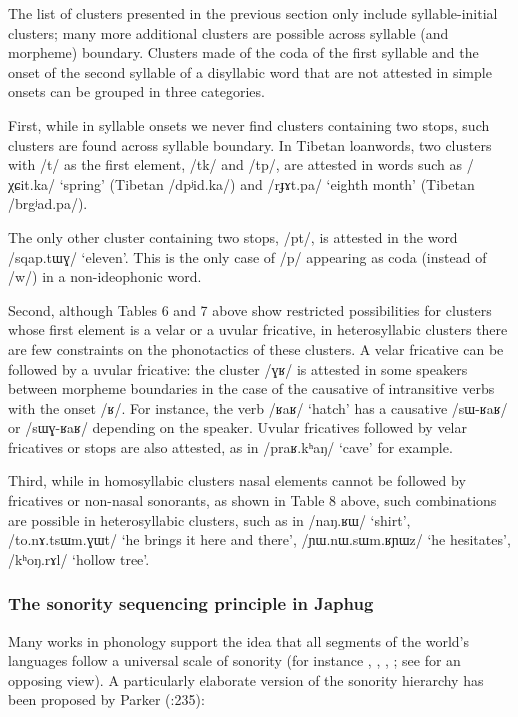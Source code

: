 \documentclass[12pt]{article}
\newcommand{\ipa}[1]{\mbox{\phon/#1/}}
\begin{document}
 The list of clusters presented in the previous section only include syllable-initial clusters; many more additional clusters are possible across syllable (and morpheme) boundary. Clusters made of the coda of the first syllable and the onset of the second syllable of a disyllabic word that are not attested in simple onsets can be grouped in three categories.
 
 First, while in syllable onsets we never find clusters containing two stops, such clusters are found across syllable boundary. In Tibetan loanwords, two clusters with \ipa{t} as the first element,  \ipa{tk} and \ipa{tp}, are attested in words such as \ipa{χɕit.ka} `spring' (Tibetan \ipa{dpʲid.ka}) and \ipa{rɟɤt.pa} `eighth month' (Tibetan \ipa{brgʲad.pa}). 
 
 The only  other cluster containing two stops, \ipa{pt}, is attested in the word  \ipa{sqap.tɯɣ} `eleven'. This is the only case of \ipa{p} appearing as coda (instead of \ipa{w}) in a non-ideophonic  word.
 
 Second, although Tables 6 and 7 above show restricted possibilities for clusters whose first element is a velar or a uvular fricative, in heterosyllabic clusters there are few constraints on the phonotactics of these clusters. A velar fricative can be followed by a uvular fricative:  the cluster \ipa{ɣʁ} is attested in some speakers between morpheme boundaries in the case of the causative of intransitive verbs with the onset \ipa{ʁ}. For instance, the verb \ipa{ʁaʁ} `hatch' has a causative \ipa{sɯ-ʁaʁ} or \ipa{sɯɣ-ʁaʁ} depending on the speaker. Uvular fricatives followed by velar fricatives or stops are also attested, as in \ipa{praʁ.kʰaŋ} `cave' for example.
 
Third, while in homosyllabic clusters nasal elements cannot be followed by fricatives or non-nasal sonorants, as shown in Table 8 above, such combinations are possible in heterosyllabic clusters, such as in \ipa{naŋ.ʁɯ} `shirt', \ipa{to.nɤ.tsɯm.ɣɯt} `he brings it here and there', \ipa{ɲɯ.nɯ.sɯm.ʁɲɯz} `he hesitates', \ipa{kʰoŋ.rɤl} `hollow tree'.

\subsubsection*{The sonority sequencing principle in Japhug}
Many works in phonology support the idea that all segments of the world's languages follow a universal scale of sonority (for instance \citealt{vennemann88syllable}, \citealt{blevins95syllable}, \citealt{parker02sonority}, \citealt{baroni14invariant}; see \citealt{ohala90sonority} for an opposing view). A particularly elaborate version of the sonority hierarchy has been proposed by Parker (\citeyear{parker02sonority}:235):
\end{document}
